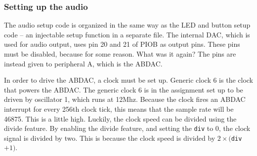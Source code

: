 \subsubsection{Setting up the audio}

The audio setup code is organized in the same way as the LED and button setup code -- an injectable setup function in a separate file.
The internal DAC, which is used for audio output, uses pin 20 and 21 of PIOB as output pins.
These pins must be disabled, because for some reason. What was it again?
The pins are instead given to peripheral A, which is the ABDAC.

In order to drive the ABDAC, a clock must be set up.
Generic clock 6 is the clock that powers the ABDAC.
The generic clock 6 is in the assignment set up to be driven by oscillator 1, which runs at 12Mhz.
Because the clock fires an ABDAC interrupt for every 256th clock tick, this means that the sample rate will be 46875.
This is a little high.
Luckily, the clock speed can be divided using the divide feature.
By enabling the divide feature, and setting the \texttt{div} to 0, the clock signal is divided by two.
This is because the clock speed is divided by $2\times($\texttt{div}$+1)$.

